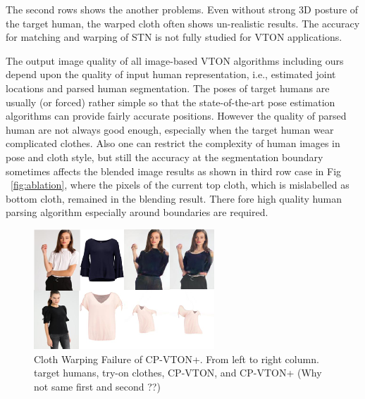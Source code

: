 The second rows shows the another problems. Even without strong 3D posture of the target human, the warped cloth often shows un-realistic results. The accuracy for matching and warping of STN is not fully studied for VTON applications. 

    
The output image quality of all image-based VTON algorithms including ours depend upon the quality of input human representation, i.e., estimated joint locations and parsed human segmentation. The poses of target humans are usually (or forced) rather simple so that the state-of-the-art pose estimation algorithms can provide fairly accurate positions. However the quality of parsed human are not always good enough, especially when the target human wear complicated clothes. Also one can restrict the complexity of human images in pose and cloth style, but still the accuracy at the segmentation boundary sometimes affects the blended image results as shown in third row case in Fig ~\ref{fig:ablation}, where the pixels of the current top cloth, which is mislabelled as bottom cloth, remained in the blending result. There fore high quality human parsing algorithm especially around boundaries are required.   

\begin{figure}
\centering
\includegraphics[height=4.5cm, scale=1]{figures/gmmfailure.png} 
\caption{Cloth Warping Failure of CP-VTON+. From left to right column. target humans, try-on clothes, CP-VTON, and CP-VTON+  (Why not same first and second ??)
}
\label{fig:gmmfailure}
\end{figure}
 